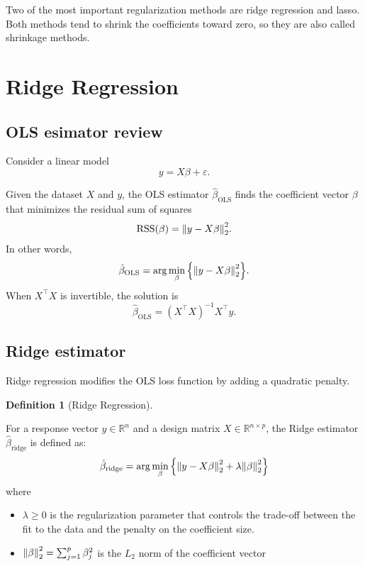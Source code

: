 \documentclass[
  letterpaper,
  DIV=11,
  numbers=noendperiod]{scrreprt}
\providecommand{\tightlist}{%
  \setlength{\itemsep}{0pt}\setlength{\parskip}{0pt}}
\newcommand{\rss}{\mathrm{RSS}}
\newcommand{\ols}{\mathrm{OLS}}
\newcommand{\ridge}{\mathrm{ridge}}
\theoremstyle{definition}
\newtheorem{definition}{Definition}[chapter]
\theoremstyle{definition}
\theoremstyle{plain}
\theoremstyle{plain}
\theoremstyle{remark}
\begin{document}
Two of the most important regularization methods are ridge regression
and lasso. Both methods tend to shrink the coefficients toward zero, so
they are also called shrinkage methods.

\section{Ridge Regression}\label{ridge-regression}

\subsection{OLS esimator review}\label{ols-esimator-review}

Consider a linear model \[
y=X\beta+\varepsilon.
\]

Given the dataset \(X\) and \(y\), the OLS estimator
\(\hat\beta_{\ols}\) finds the coefficient vector \(\beta\) that
minimizes the residual sum of squares \[
\rss(\beta)=\norm{y-X\beta}_2^2.
\] In other words, \[
\hat{\beta}_{\ols} = \arg\min_{\beta}\qty{\norm{y - X\beta}_2^2}.
\] When \(X^\top X\) is invertible, the solution is \[
\hat{\beta}_{\ols} = (X^\top X)^{-1}X^\top y.
\]

\subsection{Ridge estimator}\label{ridge-estimator}

Ridge regression modifies the OLS loss function by adding a quadratic
penalty.

\begin{definition}[Ridge
Regression]\protect\hypertarget{def-}{}\label{def-}

For a response vector \(y \in \mathbb{R}^n\) and a design matrix
\(X \in \mathbb{R}^{n \times p}\), the Ridge estimator
\(\hat{\beta}_{\ridge}\) is defined as: \[
\hat{\beta}_{\ridge} = \arg\min_{\beta} \qty{ \norm{y - X\beta}_2^2 + \lambda \norm{\beta}_2^2 }
\] where

\begin{itemize}
\tightlist
\item
  \(\lambda \ge 0\) is the regularization parameter that controls the
  trade-off between the fit to the data and the penalty on the
  coefficient size.
\item
  \(\norm{\beta}_2^2 = \sum_{j=1}^p \beta_j^2\) is the \(L_2\) norm of
  the coefficient vector
\end{itemize}

\end{definition}
\end{document}
